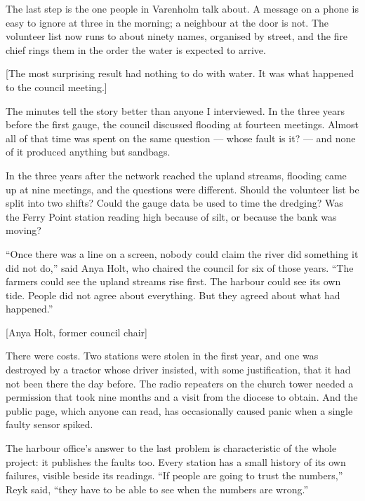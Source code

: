 \documentclass[theme=editorial,publication-type=feature-article]{reportkit}
\begin{document}
The last step is the one people in Varenholm talk about. A message on a phone is easy to ignore at three in the morning; a neighbour at the door is not. The volunteer list now runs to about ninety names, organised by street, and the fire chief rings them in the order the water is expected to arrive.

[The most surprising result had nothing to do with water. It was what happened to the council meeting.]

\begin{featurecolumns}
The minutes tell the story better than anyone I interviewed. In the three years before the first gauge, the council discussed flooding at fourteen meetings. Almost all of that time was spent on the same question --- whose fault is it? --- and none of it produced anything but sandbags.

In the three years after the network reached the upland streams, flooding came up at nine meetings, and the questions were different. Should the volunteer list be split into two shifts? Could the gauge data be used to time the dredging? Was the Ferry Point station reading high because of silt, or because the bank was moving?

“Once there was a line on a screen, nobody could claim the river did something it did not do,” said Anya Holt, who chaired the council for six of those years. “The farmers could see the upland streams rise first. The harbour could see its own tide. People did not agree about everything. But they agreed about what had happened.”

[Anya Holt, former council chair]

There were costs. Two stations were stolen in the first year, and one was destroyed by a tractor whose driver insisted, with some justification, that it had not been there the day before. The radio repeaters on the church tower needed a permission that took nine months and a visit from the diocese to obtain. And the public page, which anyone can read, has occasionally caused panic when a single faulty sensor spiked.

The harbour office's answer to the last problem is characteristic of the whole project: it publishes the faults too. Every station has a small history of its own failures, visible beside its readings. “If people are going to trust the numbers,” Reyk said, “they have to be able to see when the numbers are wrong.”
\end{featurecolumns}
\end{document}
